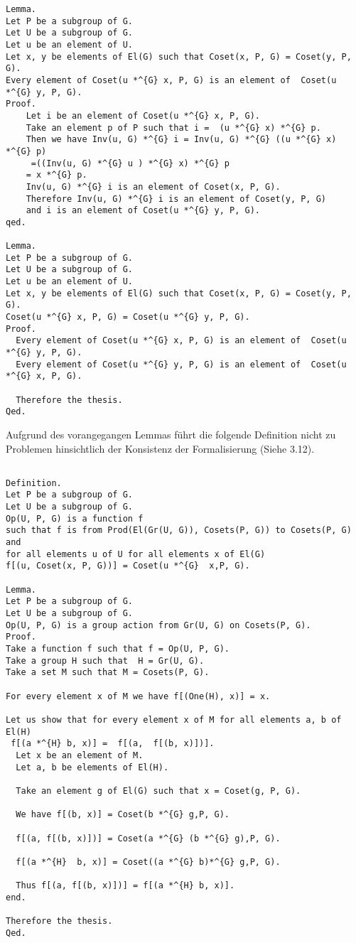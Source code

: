 \documentclass[a4paper,12pt]{scrartcl}
\begin{document}
\begin{lstlisting}
Lemma.
Let P be a subgroup of G.
Let U be a subgroup of G.
Let u be an element of U.
Let x, y be elements of El(G) such that Coset(x, P, G) = Coset(y, P, G). 
Every element of Coset(u *^{G} x, P, G) is an element of  Coset(u *^{G} y, P, G).
Proof.
    Let i be an element of Coset(u *^{G} x, P, G).
    Take an element p of P such that i =  (u *^{G} x) *^{G} p.
    Then we have Inv(u, G) *^{G} i = Inv(u, G) *^{G} ((u *^{G} x) *^{G} p)
     =((Inv(u, G) *^{G} u ) *^{G} x) *^{G} p
    = x *^{G} p.
    Inv(u, G) *^{G} i is an element of Coset(x, P, G).
    Therefore Inv(u, G) *^{G} i is an element of Coset(y, P, G)
    and i is an element of Coset(u *^{G} y, P, G).
qed.

Lemma.
Let P be a subgroup of G.
Let U be a subgroup of G.
Let u be an element of U.
Let x, y be elements of El(G) such that Coset(x, P, G) = Coset(y, P, G). 
Coset(u *^{G} x, P, G) = Coset(u *^{G} y, P, G).
Proof.
  Every element of Coset(u *^{G} x, P, G) is an element of  Coset(u *^{G} y, P, G).
  Every element of Coset(u *^{G} y, P, G) is an element of  Coset(u *^{G} x, P, G).

  Therefore the thesis.
Qed.

\end{lstlisting}

Aufgrund des vorangegangen Lemmas führt die folgende Definition nicht zu Problemen hinsichtlich der Konsistenz der Formalisierung (Siehe 3.12).

\begin{lstlisting}

Definition.
Let P be a subgroup of G.
Let U be a subgroup of G.
Op(U, P, G) is a function f 
such that f is from Prod(El(Gr(U, G)), Cosets(P, G)) to Cosets(P, G) and
for all elements u of U for all elements x of El(G) 
f[(u, Coset(x, P, G))] = Coset(u *^{G}  x,P, G).

Lemma.
Let P be a subgroup of G.
Let U be a subgroup of G.
Op(U, P, G) is a group action from Gr(U, G) on Cosets(P, G).
Proof.
Take a function f such that f = Op(U, P, G).
Take a group H such that  H = Gr(U, G).
Take a set M such that M = Cosets(P, G).

For every element x of M we have f[(One(H), x)] = x.

Let us show that for every element x of M for all elements a, b of El(H)
 f[(a *^{H} b, x)] =  f[(a,  f[(b, x)])].
  Let x be an element of M.
  Let a, b be elements of El(H).

  Take an element g of El(G) such that x = Coset(g, P, G).

  We have f[(b, x)] = Coset(b *^{G} g,P, G).

  f[(a, f[(b, x)])] = Coset(a *^{G} (b *^{G} g),P, G).

  f[(a *^{H}  b, x)] = Coset((a *^{G} b)*^{G} g,P, G).

  Thus f[(a, f[(b, x)])] = f[(a *^{H} b, x)].
end.

Therefore the thesis.
Qed.


\end{lstlisting}
\end{document}
